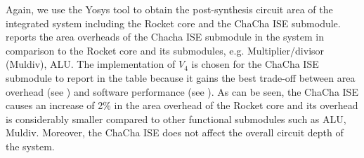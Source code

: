 Again, we use the Yosys tool to obtain the post-synthesis circuit area of the integrated system including the Rocket core and the ChaCha ISE submodule.  reports the area overheads of the Chacha ISE submodule in the system in comparison to the Rocket core and its submodules, e.g. Multiplier/divisor (Muldiv), ALU. The implementation of $V_4$ is chosen for the ChaCha ISE submodule to report in the table because it gains the best trade-off between area overhead (see ) and software performance (see ). As can be seen, the ChaCha ISE causes an increase of 2\% in the area overhead of the Rocket core and its overhead is considerably smaller compared to other functional submodules such as ALU, Muldiv. Moreover, the ChaCha ISE does not affect the overall circuit depth of the system.



